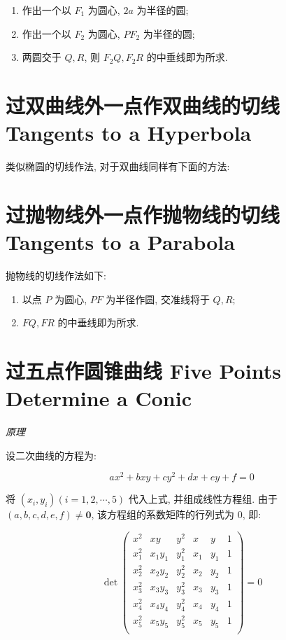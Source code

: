 \begin{enumerate}
  \item 作出一个以 $F_1$ 为圆心, $2a$ 为半径的圆;
  \item 作出一个以 $F_2$ 为圆心, $PF_2$ 为半径的圆;
  \item 两圆交于 $Q,R$, 则 $F_2Q,F_2R$ 的中垂线即为所求.
\end{enumerate}


\section{过双曲线外一点作双曲线的切线 Tangents to a Hyperbola}

类似椭圆的切线作法, 对于双曲线同样有下面的方法:



\section{过抛物线外一点作抛物线的切线 Tangents to a Parabola}

抛物线的切线作法如下:

\begin{enumerate}
  \item 以点 $P$ 为圆心, $PF$ 为半径作圆, 交准线将于 $Q,R$;
  \item $FQ,FR$ 的中垂线即为所求.
\end{enumerate}

\section{过五点作圆锥曲线 Five Points Determine a Conic}

\emph{原理}

设二次曲线的方程为:

\[
  ax^2 + bxy + cy^2 + dx + ey + f = 0
\]

将 $(x_i,y_i) (i=1,2,\cdots,5)$ 代入上式, 并组成线性方程组.
由于 $(a, b, c, d, e, f) \neq \mathbf{0}$, 该方程组的系数矩阵的行列式为 0, 即:

\[
\det \begin{pmatrix}
x^2 & xy & y^2 & x & y & 1 \\
x^2_1 & x_1y_1 & y^2_1 & x_1 & y_1 & 1 \\
x^2_2 & x_2y_2 & y^2_2 & x_2 & y_2 & 1 \\
x^2_3 & x_3y_3 & y^2_3 & x_3 & y_3 & 1 \\
x^2_4 & x_4y_4 & y^2_4 & x_4 & y_4 & 1 \\
x^2_5 & x_5y_5 & y^2_5 & x_5 & y_5 & 1 \\
\end{pmatrix} = 0
\]

